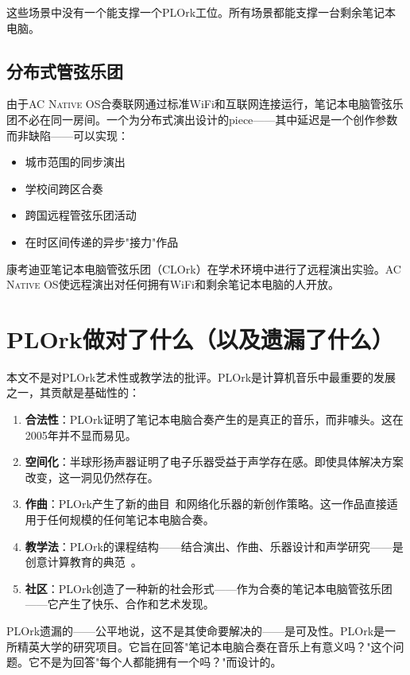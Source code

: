 \documentclass[10pt,letterpaper,twocolumn]{article}
\newcommand{\acos}{\textsc{AC Native OS}}
\begin{document}
这些场景中没有一个能支撑一个PLOrk工位。所有场景都能支撑一台剩余笔记本电脑。

\subsection{分布式管弦乐团}

由于\acos{}合奏联网通过标准WiFi和互联网连接运行，笔记本电脑管弦乐团不必在同一房间。一个为分布式演出设计的piece——其中延迟是一个创作参数而非缺陷——可以实现：

\begin{itemize}
  \item 城市范围的同步演出
  \item 学校间跨区合奏
  \item 跨国远程管弦乐团活动
  \item 在时区间传递的异步"接力"作品
\end{itemize}

康考迪亚笔记本电脑管弦乐团（CLOrk）在学术环境中进行了远程演出实验。\acos{}使远程演出对任何拥有WiFi和剩余笔记本电脑的人开放。


\section{PLOrk做对了什么（以及遗漏了什么）}
\label{sec:lessons}

本文不是对PLOrk艺术性或教学法的批评。PLOrk是计算机音乐中最重要的发展之一，其贡献是基础性的：

\begin{enumerate}
  \item \textbf{合法性}：PLOrk证明了笔记本电脑合奏产生的是真正的音乐，而非噱头。这在2005年并不显而易见。
  \item \textbf{空间化}：半球形扬声器证明了电子乐器受益于声学存在感。即使具体解决方案改变，这一洞见仍然存在。
  \item \textbf{作曲}：PLOrk产生了新的曲目~\citep{smallwood2008composing}和网络化乐器的新创作策略。这一作品直接适用于任何规模的任何笔记本电脑合奏。
  \item \textbf{教学法}：PLOrk的课程结构——结合演出、作曲、乐器设计和声学研究——是创意计算教育的典范~\citep{trueman2007why}。
  \item \textbf{社区}：PLOrk创造了一种新的社会形式——作为合奏的笔记本电脑管弦乐团——它产生了快乐、合作和艺术发现。
\end{enumerate}

PLOrk遗漏的——公平地说，这不是其使命要解决的——是可及性。PLOrk是一所精英大学的研究项目。它旨在回答"笔记本电脑合奏在音乐上有意义吗？"这个问题。它不是为回答"每个人都能拥有一个吗？"而设计的。
\end{document}
